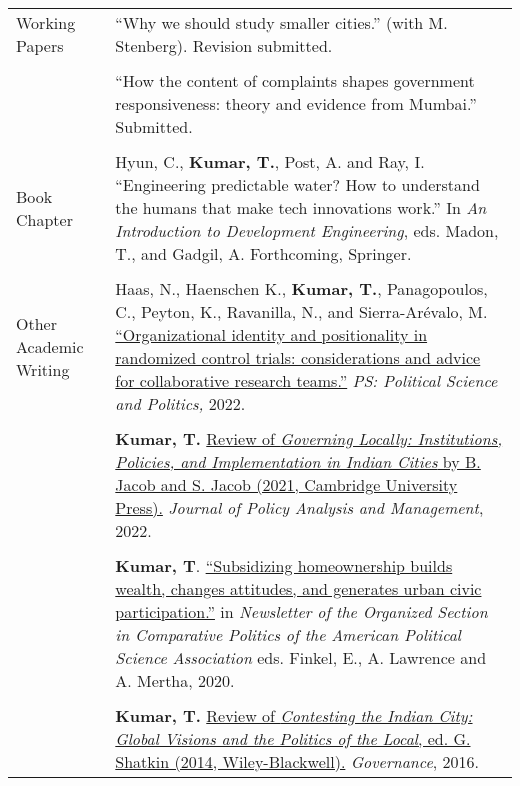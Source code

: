 \documentclass[letterpaper, 11pt]{article}
\begin{document}
\begin{longtable}{p{1in}p{5.5in}}
{{Working Papers}} 
& ``Why we should study smaller cities.'' (with M. Stenberg). Revision submitted. \\
& \\
& ``How the content of complaints shapes government responsiveness: theory and evidence from Mumbai.'' Submitted. \\
& \\


{{Book Chapter}} 
& Hyun, C., \textbf{Kumar, T.}, Post, A. and Ray, I. ``Engineering predictable water? How to understand the humans that make tech innovations work.'' In \textit{An Introduction to Development Engineering}, eds. Madon, T., and Gadgil, A. Forthcoming, Springer.\\

& \\

{{Other Academic Writing}} 
& Haas, N., Haenschen K., \textbf{Kumar, T.}, Panagopoulos, C., Peyton, K., Ravanilla, N., and Sierra-Ar\'{e}valo, M. \href{https://www.doi.org/10.1017/S1049096522000026}{``Organizational identity and positionality in randomized control trials: considerations and advice for collaborative research teams.''} \textit{PS: Political Science and Politics,} 2022. \\
& \\


& \textbf{Kumar, T.} \href{https://doi.org/10.1002/pam.22390}{Review of \textit{Governing Locally: Institutions, Policies, and Implementation in Indian Cities} by B. Jacob and S. Jacob (2021, Cambridge University Press).}  \textit{Journal of Policy Analysis and Management}, 2022. \\


& \\


& \textbf{Kumar, T}.
 \href{https://www.comparativepoliticsnewsletter.org/wp-content/uploads/2020/05/Spring-Newsletter-2020.pdf}{``Subsidizing homeownership builds wealth, changes attitudes, and generates urban civic participation.''} in \textit{Newsletter of the Organized Section in Comparative Politics of the American Political Science Association} eds. Finkel, E., A. Lawrence and A. Mertha, 2020. \\
&\\
& \textbf{Kumar, T.} \href{http://onlinelibrary.wiley.com/doi/10.1111/gove.12241/abstract}{Review of \textit{Contesting the Indian City: Global Visions and the Politics of the Local}, ed. G. Shatkin (2014, Wiley-Blackwell).} \textit{Governance}, 2016. 


\end{longtable}
\end{document}
